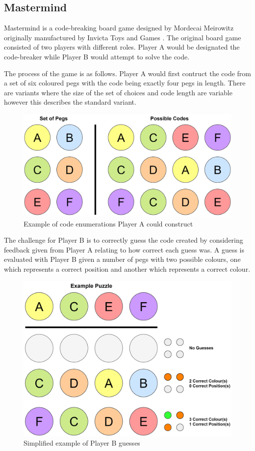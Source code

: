 \documentclass[12pt]{article}  %
\theoremstyle{definition}
\theoremstyle{remark}
\begin{document}
\subsection {Mastermind}
Mastermind is a code-breaking board game designed by Mordecai Meirowitz originally manufactured by Invicta Toys and Games \cite{Invicta}. 
The original board game consisted of two players with different roles. Player A would be designated the code-breaker while Player B would attempt to solve the code.

The process of the game is as follows.
Player A would first contruct the code from a set of six coloured pegs with the code being exactly four pegs in length. There are variants where the size of the set of choices and code length are variable however this describes the standard variant.

\begin{figure}[H]
\centering
\includegraphics[scale=0.75]{pegs}
\caption{ Example of code enumerations Player A could construct}
\end{figure}

The challenge for Player B is to correctly guess the code created by considering feedback given from Player A relating to how correct each guess was.
A guess is evaluated with Player B given a number of pegs with two possible colours, one which represents a correct position and another which represents a correct colour.

\begin{figure}[H]
\centering
\includegraphics[scale=0.75]{guesses}
\caption{ Simplified example of Player B guesses}
\end{figure}
\end{document}
